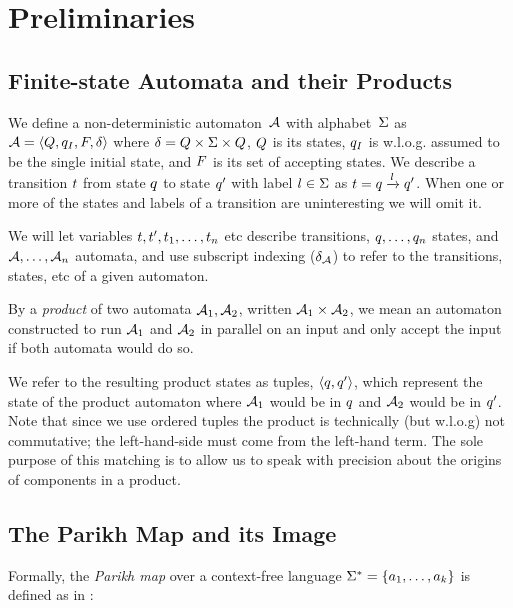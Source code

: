 \documentclass[acmsmall,review,anonymous,screen]{acmart}\settopmatter{printfolios=true,printccs=false,printacmref=true}
\theoremstyle{definition}
\begin{document}
\section{Preliminaries}

\subsection{Finite-state Automata and their Products}
We define a non-deterministic automaton~$\mathcal{A}$ with alphabet~$\Sigma$
as $\mathcal{A} = \left\langle Q, q_I, F, \delta\right\rangle$ where $\delta = Q \times \Sigma
\times Q$, $Q$ is its states, $q_I$ is w.l.o.g. assumed to
be the single initial state, and $F$ is its set of accepting
states.  We describe a transition $t$ from state $q$ to state
$q'$ with label $l \in \Sigma$ as $t =
q \xrightarrow{l} q'$. When one or more of the states and
labels of a transition are uninteresting we will omit it.

We will let variables $t, t', t_1, \ldots,
t_n$ etc describe transitions, $q, \ldots, q_n$ states, and
$\mathcal{A}, \ldots, \mathcal{A}_n$ automata, and use subscript indexing
($\delta_{\mathcal{A}}$) to refer to the transitions, states, etc of a given
automaton.

By a \emph{product} of two automata $\mathcal{A}_1, \mathcal{A}_2$, written
$\mathcal{A}_1 \times \mathcal{A}_2$, we mean an automaton constructed to run
$\mathcal{A}_1$ and $\mathcal{A}_2$ in parallel on an input and only accept the
input if both automata would do so.

We refer to the resulting product states as tuples, $\left\langle q, q'\right\rangle$,
which represent the state of the product automaton where $\mathcal{A}_1$ would be
in $q$ and $\mathcal{A}_2$ would be in $q'$. Note that since we use
ordered tuples the product is technically (but w.l.o.g) not commutative; the
left-hand-side must come from the left-hand term. The sole purpose of this
matching is to allow us to speak with precision about the origins of components
in a product.

\subsection{The Parikh Map and its Image}
Formally, the \textit{Parikh map} over a context-free language $\Sigma^*=
\left\{a_1, \ldots, a_k \right\}$ is defined as in \cite{kozen}:
\end{document}
